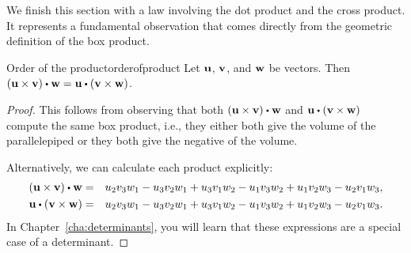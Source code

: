 We finish this section with a law involving the dot product and the
cross product. It represents a fundamental observation that comes
directly from the geometric definition of the box product. 

\begin{proposition}{Order of the product}{orderofproduct}
  Let $\mbox{\bf u}$, $\mbox{\bf v}$, and $\mbox{\bf w}$ be vectors. Then
  $\tup{\vect{u}\times\vect{v}} \dotprod \vect{w}=\vect{u}\dotprod
  \tup{\vect{v}\times \vect{w}}$.
\end{proposition}

\begin{proof}
  This follows from observing that both
  $\tup{\vect{u}\times \vect{v}} \dotprod \vect{w}$ and
  $\vect{u}\dotprod \tup{\vect{v}\times \vect{w}}$ compute the same
  box product, i.e., they either both give the volume of the
  parallelepiped or they both give the negative of the volume.

  Alternatively, we can calculate each product explicitly:
  \begin{eqnarray*}
    \tup{\vect{u}\times \vect{v}} \dotprod \vect{w}
    &=&
        u_2v_3w_1 - u_3v_2w_1
      + u_3v_1w_2 - u_1v_3w_2
        + u_1v_2w_3 - u_2v_1w_3,\\
    \vect{u}\dotprod \tup{\vect{v}\times \vect{w}}
    &=&
        u_2v_3w_1 - u_3v_2w_1
      + u_3v_1w_2 - u_1v_3w_2
        + u_1v_2w_3 - u_2v_1w_3.
  \end{eqnarray*}
  In Chapter~\ref{cha:determinants}, you will learn that these
  expressions are a special case of a determinant. 
\end{proof}



